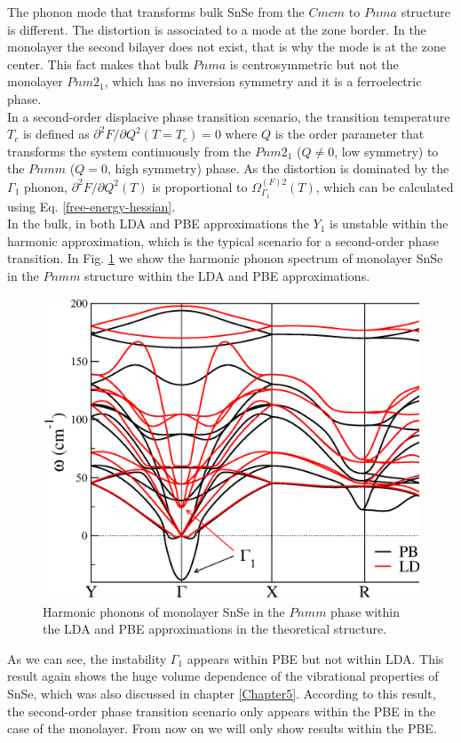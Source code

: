 The phonon mode that transforms bulk SnSe from the $Cmcm$ to $Pnma$ structure is different. The distortion is 
associated to a mode at the zone border. In the monolayer the second bilayer does not exist, that is why the mode is 
at the zone center. This fact makes that bulk $Pnma$ is centrosymmetric but not the monolayer $Pnm2_{1}$, which 
has no inversion symmetry and it is a ferroelectric phase. \\

In a second-order displacive phase transition scenario, the transition temperature $T_{c}$ is defined as 
$\partial^{2}F/\partial Q^{2}(T=T_{c})=0$ where $Q$ is the order parameter that transforms the system continuously 
from the $Pnm2_{1}$ ($Q\ne0$, low symmetry) to the $Pnmm$ ($Q=0$, high symmetry) phase. As the distortion is 
dominated by the $\Gamma_{1}$ phonon, $\partial^{2}F/\partial Q^{2}(T)$ is proportional to 
$\Omega^{(F)2}_{\Gamma_{1}}(T)$, which can be calculated using Eq. \ref{free-energy-hessian}. \\

In the bulk, in both LDA and PBE approximations the $Y_{1}$ is unstable within the harmonic approximation, 
which is the typical scenario for a second-order phase transition. In Fig. \ref{harmonic-mono} we show the 
harmonic phonon spectrum of monolayer SnSe in the $Pnmm$ structure within the LDA and PBE approximations. 
\begin{figure}[h]
\includegraphics[width=\linewidth]{Figures/harmonic-mono.eps}
\caption[Harmonic phonons of monolayer SnSe.]{Harmonic phonons of monolayer SnSe in the $Pnmm$ phase within the LDA 
and PBE approximations in the theoretical structure.}
\label{harmonic-mono}
\end{figure}
As we can see, the instability $\Gamma_{1}$ appears within PBE but not within LDA. This result again shows the huge 
volume dependence of the vibrational properties of SnSe, which was also discussed in chapter \ref{Chapter5}. 
According to this result, the second-order phase transition scenario only appears within the PBE in the case of the 
monolayer. From now on we will only show results within the PBE. \\

